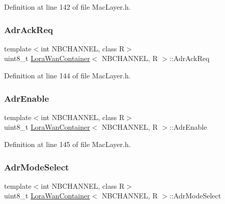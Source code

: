 Definition at line 142 of file Mac\+Layer.\+h.

\mbox{\label{class_lora_wan_container_a439b4f69a284db6eba911792a41c767a}} 
\subsubsection{\texorpdfstring{Adr\+Ack\+Req}{AdrAckReq}}
{\footnotesize\ttfamily template$<$int N\+B\+C\+H\+A\+N\+N\+EL, class R$>$ \\
uint8\+\_\+t \mbox{\hyperlink{class_lora_wan_container}{Lora\+Wan\+Container}}$<$ N\+B\+C\+H\+A\+N\+N\+EL, R $>$\+::Adr\+Ack\+Req}



Definition at line 144 of file Mac\+Layer.\+h.

\mbox{\label{class_lora_wan_container_a886dfe29c3f405f8fcd7943da9b5285f}} 
\subsubsection{\texorpdfstring{Adr\+Enable}{AdrEnable}}
{\footnotesize\ttfamily template$<$int N\+B\+C\+H\+A\+N\+N\+EL, class R$>$ \\
uint8\+\_\+t \mbox{\hyperlink{class_lora_wan_container}{Lora\+Wan\+Container}}$<$ N\+B\+C\+H\+A\+N\+N\+EL, R $>$\+::Adr\+Enable}



Definition at line 145 of file Mac\+Layer.\+h.

\mbox{\label{class_lora_wan_container_a020a7c766b4791fde846cc634f4ce577}} 
\subsubsection{\texorpdfstring{Adr\+Mode\+Select}{AdrModeSelect}}
{\footnotesize\ttfamily template$<$int N\+B\+C\+H\+A\+N\+N\+EL, class R$>$ \\
uint8\+\_\+t \mbox{\hyperlink{class_lora_wan_container}{Lora\+Wan\+Container}}$<$ N\+B\+C\+H\+A\+N\+N\+EL, R $>$\+::Adr\+Mode\+Select}



